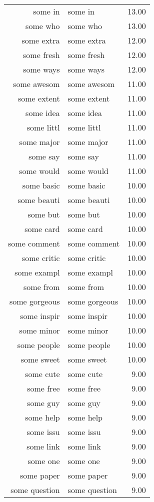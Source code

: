 \begin{table}[ht]
\begin{tabular}{rlr}
  some in & some in & 13.00 \\ 
  some who & some who & 13.00 \\ 
  some extra & some extra & 12.00 \\ 
  some fresh & some fresh & 12.00 \\ 
  some ways & some ways & 12.00 \\ 
  some awesom & some awesom & 11.00 \\ 
  some extent & some extent & 11.00 \\ 
  some idea & some idea & 11.00 \\ 
  some littl & some littl & 11.00 \\ 
  some major & some major & 11.00 \\ 
  some say & some say & 11.00 \\ 
  some would & some would & 11.00 \\ 
  some basic & some basic & 10.00 \\ 
  some beauti & some beauti & 10.00 \\ 
  some but & some but & 10.00 \\ 
  some card & some card & 10.00 \\ 
  some comment & some comment & 10.00 \\ 
  some critic & some critic & 10.00 \\ 
  some exampl & some exampl & 10.00 \\ 
  some from & some from & 10.00 \\ 
  some gorgeous & some gorgeous & 10.00 \\ 
  some inspir & some inspir & 10.00 \\ 
  some minor & some minor & 10.00 \\ 
  some people & some people & 10.00 \\ 
  some sweet & some sweet & 10.00 \\ 
  some cute & some cute & 9.00 \\ 
  some free & some free & 9.00 \\ 
  some guy & some guy & 9.00 \\ 
  some help & some help & 9.00 \\ 
  some issu & some issu & 9.00 \\ 
  some link & some link & 9.00 \\ 
  some one & some one & 9.00 \\ 
  some paper & some paper & 9.00 \\ 
  some question & some question & 9.00 \\ 

\end{tabular}
\end{table}
